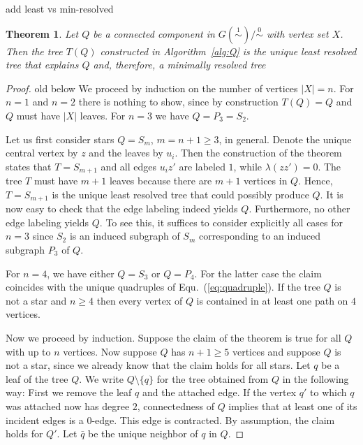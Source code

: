 \documentclass[smallextended]{svjour3}
\newcommand{\TODO}[1]{\begingroup\color{red}#1\endgroup}
\newcommand{\remove}[1]{\begingroup\color{magenta}#1\endgroup}
\newcommand{\Ro}{\mathrel{\overset{0}{\sim}}}
\newcommand{\Rl}{\mathrel{\overset{1}{\sim}}}
\newtheorem{thm}{Theorem}
\begin{document}
\TODO{add least vs min-resolved}
\begin{thm}
  Let $Q$ be a connected component in $G(\Rl)/\Ro$ with vertex set $X$.
  Then the tree $T(Q)$ constructed in Algorithm~\ref{alg:Q} is the unique
  least resolved tree that explains $Q$ and, therefore, a minimally resolved tree
  \label{thm:connComp}
\end{thm}
\begin{proof}
	
	




  \remove{old below}
  We proceed by induction on the number of vertices $|X|=n$.  For $n=1$ and
  $n=2$ there is nothing to show, since by construction $T(Q)=Q$ and $Q$
  must have $|X|$ leaves.  For $n=3$ we have $Q=P_3=S_2$.

  Let us first consider stars $Q=S_m$, $m=n+1\ge 3$, in general. Denote the
  unique central vertex by $z$ and the leaves by $u_i$. Then the
  construction of the theorem states that $T=S_{m+1}$ and all edges $u_iz'$
  are labeled $1$, while $\lambda(zz')=0$. The tree $T$ must have $m+1$
  leaves because there are $m+1$ vertices in $Q$. Hence, $T=S_{m+1}$ is the
  unique least resolved tree that could possibly produce $Q$. It is now
  easy to check that the edge labeling indeed yields $Q$. Furthermore, no
  other edge labeling yields $Q$. To see this, it suffices to consider
  explicitly all cases for $n=3$ since $S_2$ is an induced subgraph of
  $S_m$ corresponding to an induced subgraph $P_3$ of $Q$.

  For $n=4$, we have either $Q=S_3$ or $Q=P_4$. For the latter case the
  claim coincides with the unique quadruples of Equ.~(\ref{eq:quadruple}).
  If the tree $Q$ is not a star and $n\ge 4$ then every vertex of $Q$ is
  contained in at least one path on $4$ vertices.

  Now we proceed by induction. Suppose the claim of the theorem is true for
  all $Q$ with up to $n$ vertices. Now suppose $Q$ has $n+1\ge 5$ vertices
  and suppose $Q$ is not a star, since we already know that the claim holds
  for all stars. Let $q$ be a leaf of the tree $Q$. We write
  $Q\setminus\{q\}$ for the tree obtained from $Q$ in the following way:
  First we remove the leaf $q$ and the attached edge. If the vertex $q'$ to
  which $q$ was attached now has degree $2$, connectedness of $Q$ implies
  that at least one of its incident edges is a 0-edge. This edge is
  contracted.  By assumption, the claim holds for $Q'$. Let $\bar q$ be the
  unique neighbor of $q$ in $Q$.
 

\end{proof}
\end{document}
